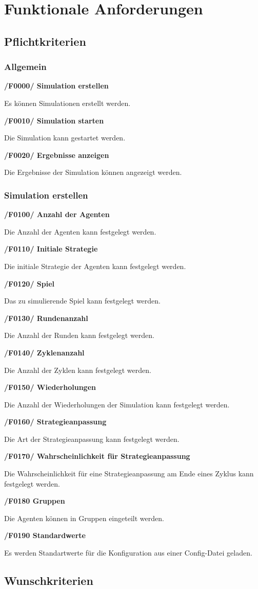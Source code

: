 \section{Funktionale Anforderungen}

\subsection{Pflichtkriterien}

\subsubsection{Allgemein}

\textbf{/F0000/ Simulation erstellen}

Es können Simulationen erstellt werden.

\textbf{/F0010/ Simulation starten}

Die Simulation kann gestartet werden.

\textbf{/F0020/ Ergebnisse anzeigen}

Die Ergebnisse der Simulation können angezeigt werden.

\subsubsection{Simulation erstellen}

\textbf{/F0100/ Anzahl der Agenten}

Die Anzahl der Agenten kann festgelegt werden.

\textbf{/F0110/ Initiale Strategie}

Die initiale Strategie der Agenten kann festgelegt werden.

\textbf{/F0120/ Spiel}

Das zu simulierende Spiel kann festgelegt werden.

\textbf{/F0130/ Rundenanzahl}

Die Anzahl der Runden kann festgelegt werden.

\textbf{/F0140/ Zyklenanzahl}

Die Anzahl der Zyklen kann festgelegt werden.

\textbf{/F0150/ Wiederholungen}

Die Anzahl der Wiederholungen der Simulation kann festgelegt werden.

\textbf{/F0160/ Strategieanpassung}

Die Art der Strategieanpassung kann festgelegt werden. 

\textbf{/F0170/ Wahrscheinlichkeit für Strategieanpassung}

Die Wahrscheinlichkeit für eine Strategieanpassung am Ende eines Zyklus kann festgelegt werden.

\textbf{/F0180 Gruppen}

Die Agenten können in Gruppen eingeteilt werden.

\textbf{/F0190 Standardwerte}

Es werden Standartwerte für die Konfiguration aus einer Config-Datei geladen.

\subsection{Wunschkriterien}
